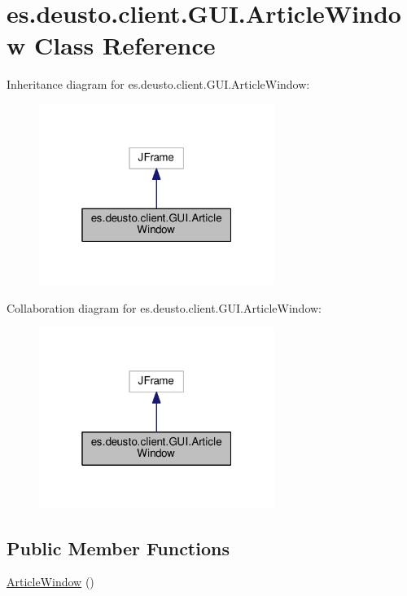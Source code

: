 \hypertarget{classes_1_1deusto_1_1client_1_1_g_u_i_1_1_article_window}{}\section{es.\+deusto.\+client.\+G\+U\+I.\+Article\+Window Class Reference}
\label{classes_1_1deusto_1_1client_1_1_g_u_i_1_1_article_window}


Inheritance diagram for es.\+deusto.\+client.\+G\+U\+I.\+Article\+Window\+:\nopagebreak
\begin{figure}[H]
\begin{center}
\leavevmode
\includegraphics[width=217pt]{classes_1_1deusto_1_1client_1_1_g_u_i_1_1_article_window__inherit__graph}
\end{center}
\end{figure}


Collaboration diagram for es.\+deusto.\+client.\+G\+U\+I.\+Article\+Window\+:\nopagebreak
\begin{figure}[H]
\begin{center}
\leavevmode
\includegraphics[width=217pt]{classes_1_1deusto_1_1client_1_1_g_u_i_1_1_article_window__coll__graph}
\end{center}
\end{figure}
\subsection*{Public Member Functions}
\begin{DoxyCompactItemize}
\item 
\hyperlink{classes_1_1deusto_1_1client_1_1_g_u_i_1_1_article_window_a32785c5a8d12fccb60c87c7dacf53e7f}{Article\+Window} ()
\end{DoxyCompactItemize}


